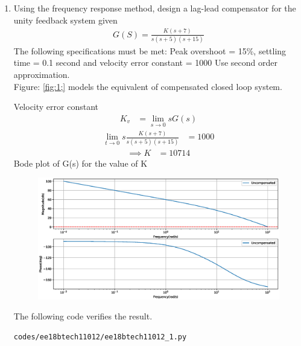 \begin{enumerate}[label=\thesubsection.\arabic*.,ref=\thesubsection.\theenumi]
\item Using the frequency response method, design a lag-lead compensator for the unity feedback system given 
\begin{align}
G(S) = \frac{K(s+7)}{s(s+5)(s+15)}
\end{align}
The following specifications must be met: Peak overshoot = 15\%, settling time = 0.1 second and velocity error constant = 1000
Use second order approximation. \\
%
\solution Figure: \ref{fig:1;} models the equivalent of compensated closed loop system. 
\begin{figure}[!ht]
\begin{center}
		\resizebox{\columnwidth}{!}{}
\end{center}
\caption{}
\label{fig:ee18btech11012_1;}
\end{figure}
%
Velocity error constant  
\begin{align}
K_{v} &=  \lim_{s \to 0}sG(s)
\end{align}
\begin{align}
\lim_{t \to 0}s\frac{K(s+7)}{s(s+5)(s+15)} &= 1000
\end{align}
\begin{align}
\implies K &= 10714
\end{align}
Bode plot of G(s) for the value of K
\begin{figure}[!ht]
\centering
  \includegraphics[width=\columnwidth]{./figs/ee18btech11012/ee18btech11012.eps}
\caption{}
\label{fig:ee18btech11012_2}
\end{figure}
The following code verifies the result.
\begin{lstlisting}
codes/ee18btech11012/ee18btech11012_1.py

\end{lstlisting}
\end{enumerate}
